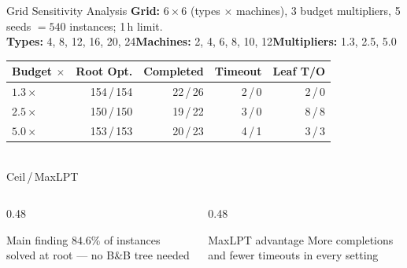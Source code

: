\documentclass[fleqn,11pt,aspectratio=43]{beamer}
\begin{document}
\begin{frame}[shrink=8]{Grid Sensitivity Analysis}
  \textbf{Grid:} $6{\times}6$ (types $\times$ machines), 3 budget multipliers, 5 seeds $=540$ instances; 1\,h limit.\\[0.15em]
  \footnotesize\textbf{Types:} 4, 8, 12, 16, 20, 24\quad\textbullet\quad\textbf{Machines:} 2, 4, 6, 8, 10, 12\quad\textbullet\quad\textbf{Multipliers:} 1.3, 2.5, 5.0\normalsize

  \begin{center}\small
  \begin{tabular}{lrrrr}
    \toprule
    Budget $\times$ & Root Opt. & Completed & Timeout & Leaf T/O\\
    \midrule
    $1.3\times$ & 154\,/\,154 & 22\,/\,26 & 2\,/\,0 & 2\,/\,0\\
    $2.5\times$ & 150\,/\,150 & 19\,/\,22 & 3\,/\,0 & 8\,/\,8\\
    $5.0\times$ & 153\,/\,153 & 20\,/\,23 & 4\,/\,1 & 3\,/\,3\\
    \bottomrule
  \end{tabular}\\[0.2em]
  \footnotesize Ceil\,/\,MaxLPT
  \end{center}

  \begin{columns}[T]
    \begin{column}{0.48\textwidth}
      \begin{alertblock}{Main finding}
        $\mathbf{84.6\%}$ of instances solved at root —
        no B\&B tree needed
      \end{alertblock}
    \end{column}
    \begin{column}{0.48\textwidth}
      \begin{block}{MaxLPT advantage}
        More completions and fewer timeouts in every setting
      \end{block}
    \end{column}
  \end{columns}
\end{frame}
\end{document}
